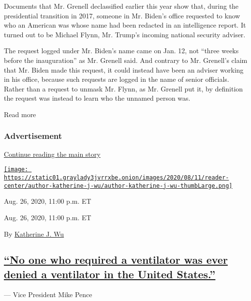 Documents that Mr. Grenell declassified earlier this year show that,
during the presidential transition in 2017, someone in Mr. Biden's
office requested to know who an American was whose name had been
redacted in an intelligence report. It turned out to be Michael Flynn,
Mr. Trump's incoming national security adviser.

The request logged under Mr. Biden's name came on Jan. 12, not ``three
weeks before the inauguration'' as Mr. Grenell said. And contrary to Mr.
Grenell's claim that Mr. Biden made this request, it could instead have
been an adviser working in his office, because such requests are logged
in the name of senior officials. Rather than a request to unmask Mr.
Flynn, as Mr. Grenell put it, by definition the request was instead to
learn who the unnamed person was.

Read more

\hypertarget{advertisement-3}{%
\subsubsection{Advertisement}\label{advertisement-3}}

\protect\hyperlink{after-dfp-ad-mid4}{Continue reading the main story}

\href{https://www.nytimes3xbfgragh.onion/by/katherine-j--wu}{\texttt{[image: https://static01.graylady3jvrrxbe.onion/images/2020/08/11/reader-center/author-katherine-j-wu/author-katherine-j-wu-thumbLarge.png]}}

Aug. 26, 2020, 11:00 p.m. ET

Aug. 26, 2020, 11:00 p.m. ET

By
\href{https://www.nytimes3xbfgragh.onion/by/katherine-j--wu}{Katherine
J. Wu}

\hypertarget{no-one-who-required-a-ventilator-was-ever-denied-a-ventilator-in-the-united-states}{%
\subsection{\texorpdfstring{\protect\hyperlink{no-one-who-required-a-ventilator-was-ever-denied-a-ventilator-in-the-united-states}{``No
one who required a ventilator was ever denied a ventilator in the United
States.''}}{``No one who required a ventilator was ever denied a ventilator in the United States.''}}\label{no-one-who-required-a-ventilator-was-ever-denied-a-ventilator-in-the-united-states}}

--- Vice President Mike Pence


